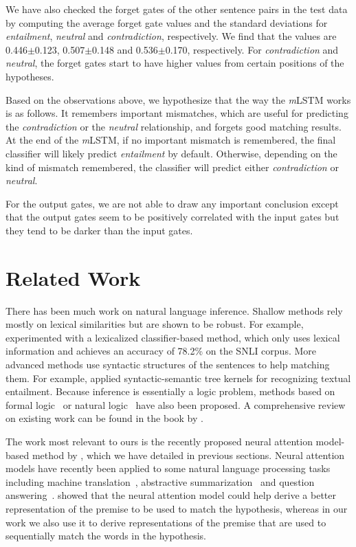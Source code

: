 \documentclass[11pt,letterpaper]{article}
\begin{document}
We have also checked the forget gates of the other sentence pairs in the test data by computing the average forget gate values and the standard deviations for \emph{entailment}, \emph{neutral} and \emph{contradiction}, respectively.
We find that the values are 0.446$\pm$0.123, 0.507$\pm$0.148 and 0.536$\pm$0.170, respectively.
For \emph{contradiction} and \emph{neutral}, the forget gates start to have higher values from certain positions of the hypotheses.

Based on the observations above, we hypothesize that the way the \emph{m}LSTM works is as follows. It remembers important mismatches, which are useful for predicting the \emph{contradiction} or the \emph{neutral} relationship, and forgets good matching results.
At the end of the \emph{m}LSTM, if no important mismatch is remembered, the final classifier will likely predict \emph{entailment} by default.
Otherwise, depending on the kind of mismatch remembered, the classifier will predict either \emph{contradiction} or \emph{neutral}.



For the output gates, we are not able to draw any important conclusion except that the output gates seem to be positively correlated with the input gates but they tend to be darker than the input gates.



 \section{Related Work}

There has been much work on natural language inference.
Shallow methods rely mostly on lexical similarities but are shown to be robust.
For example,  experimented with a lexicalized classifier-based method, which only uses lexical information 
and achieves an accuracy of 78.2\% on the SNLI corpus.
More advanced methods use syntactic structures of the sentences to help matching them.
For example,  applied syntactic-semantic tree kernels for recognizing textual entailment.
Because inference is essentially a logic problem, methods based on formal logic~\cite{clark:tac09} or natural logic~\cite{maccartney:09} have also been proposed.
A comprehensive review on existing work 
can be found in the book by .

The work most relevant to ours is the recently proposed neural attention model-based method by , which we have detailed in previous sections.
Neural attention models have recently been applied to some natural language processing tasks including machine translation~\cite{bahdanau:icrl15}, abstractive summarization~\cite{rush2015neural} and question answering~\cite{hermann2015teaching}.
 showed that the neural attention model could help derive a better representation of the premise to be used to match the hypothesis, whereas in our work we also use it to derive representations of the premise that are used to sequentially match the words in the hypothesis.
\end{document}
